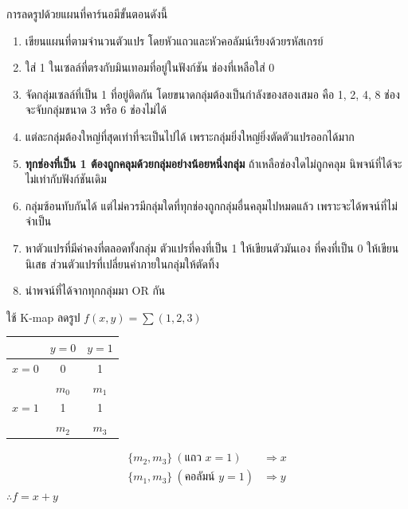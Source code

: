 \begin{principle}
\label{prin:kmap-rules}
การลดรูปด้วยแผนที่คาร์นอมีขั้นตอนดังนี้
\begin{enumerate}
    \item เขียนแผนที่ตามจำนวนตัวแปร โดยหัวแถวและหัวคอลัมน์เรียงด้วยรหัสเกรย์
    \item ใส่ 1 ในเซลล์ที่ตรงกับมินเทอมที่อยู่ในฟังก์ชัน ช่องที่เหลือใส่ 0
    \item จัดกลุ่มเซลล์ที่เป็น 1 ที่อยู่ติดกัน โดยขนาดกลุ่มต้องเป็นกำลังของสองเสมอ คือ 1, 2, 4, 8 ช่อง จะจับกลุ่มขนาด 3 หรือ 6 ช่องไม่ได้
    \item แต่ละกลุ่มต้องใหญ่ที่สุดเท่าที่จะเป็นไปได้ เพราะกลุ่มยิ่งใหญ่ยิ่งตัดตัวแปรออกได้มาก
    \item \textbf{ทุกช่องที่เป็น 1 ต้องถูกคลุมด้วยกลุ่มอย่างน้อยหนึ่งกลุ่ม} ถ้าเหลือช่องใดไม่ถูกคลุม นิพจน์ที่ได้จะไม่เท่ากับฟังก์ชันเดิม
    \item กลุ่มซ้อนทับกันได้ แต่ไม่ควรมีกลุ่มใดที่ทุกช่องถูกกลุ่มอื่นคลุมไปหมดแล้ว เพราะจะได้พจน์ที่ไม่จำเป็น
    \item หาตัวแปรที่มีค่าคงที่ตลอดทั้งกลุ่ม ตัวแปรที่คงที่เป็น 1 ให้เขียนตัวมันเอง ที่คงที่เป็น 0 ให้เขียนนิเสธ ส่วนตัวแปรที่เปลี่ยนค่าภายในกลุ่มให้ตัดทิ้ง
    \item นำพจน์ที่ได้จากทุกกลุ่มมา OR กัน
\end{enumerate}
\end{principle}


\begin{ex}
\label{ex:kmap-2var-a}
ใช้ K-map ลดรูป $f(x, y) = \sum(1, 2, 3)$

\begin{center}
\begin{tabular}{|c|c|c|}
\hline
 & $y = 0$ & $y = 1$ \\
\hline
$x = 0$ & 0 & 1 \\
       & $m_0$ & $m_1$ \\
\hline
$x = 1$ & 1 & 1 \\
       & $m_2$ & $m_3$ \\
\hline
\end{tabular}
\end{center}
\end{ex}
\begin{solution}
\begin{align*}
\{m_2, m_3\}\ (\text{แถว } x = 1) &\Rightarrow x\\
\{m_1, m_3\}\ (\text{คอลัมน์ } y = 1) &\Rightarrow y
\end{align*}
$\therefore f = x + y$ \solhere
\end{solution}

